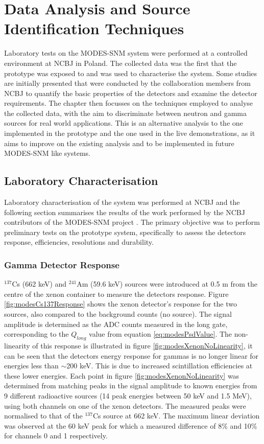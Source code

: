 \chapter{Data Analysis and Source Identification Techniques}
Laboratory tests on the MODES-SNM system were performed at a controlled environment at NCBJ in Poland. The collected data was the first that the prototype was exposed to and was used to characterise the system. Some studies are initially presented that were conducted by the collaboration members from NCBJ to quantify the basic properties of the detectors and examine the detector requirements. The chapter then focusses on the techniques employed to analyse the collected data, with the aim to discriminate between neutron and gamma sources for real world applications. This is an alternative analysis to the one implemented in the prototype and the one used in the live demonstrations, as it aims to improve on the existing analysis and to be implemented in future MODES-SNM like systems.

\section{Laboratory Characterisation}
Laboratory characterisation of the system was performed at NCBJ and the following section summarises the results of the work performed by the NCBJ contributors of the MODES-SNM project \cite{modesInternal}. The primary objective was to perform preliminary tests on the prototype system, specifically to assess the detectors response, efficiencies, resolutions and durability.

\subsection{Gamma Detector Response}
$^{137}$Cs (662 keV) and $^{241}$Am (59.6 keV) sources were introduced at 0.5 m from the centre of the xenon container to measure the detectors response. Figure \ref{fig:modesCs137Response} shows the xenon detector's response for the two sources, also compared to the background counts (no source). The signal amplitude is determined as the ADC counts measured in the long gate, corresponding to the $Q_{long}$ value from equation \ref{eq:modesPsdValue}. The non-linearity of this response is illustrated in figure \ref{fig:modesXenonNoLinearity}, it can be seen that the detectors energy response for gammas is no longer linear for energies less than $\sim$200 keV. This is due to increased scintillation efficiencies at these lower energies. Each point in figure \ref{fig:modesXenonNoLinearity} was determined from matching peaks in the signal amplitude to known energies from 9 different radioactive sources (14 peak energies between 50 keV and 1.5 MeV), using both channels on one of the xenon detectors. The measured peaks were normalised to that of the $^{137}$Cs source at 662 keV. The maximum linear deviation was observed at the 60 keV peak for which a measured difference of 8\% and 10\% for channels 0 and 1 respectively.

